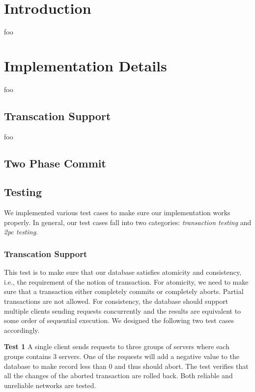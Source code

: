 \documentclass{vldb}
\begin{document}
\section{Introduction}

foo


\section{Implementation Details}

foo

\subsection{Transcation Support}

foo

\subsection{Two Phase Commit}

\subsection{Testing}

We implemented various test cases to make sure our implementation 
works properly. In general, our test cases fall into two categories: 
\textit{transaction testing} and \textit{2pc testing}. 

\subsubsection{Transcation Support}

This test is to make sure that our database satisfies atomicity and 
consistency, i.e., the requirement of the notion of transaction. For 
atomicity, we need to make sure that a transaction either completely 
commits or completely aborts. Partial transactions are not allowed.  
For consistency, the database should support multiple clients sending 
requests concurrently and the results are equivalent to some order of 
sequential execution. We designed the following two test cases 
accordingly.

\textbf{Test 1} A single client sends requests to three groups of 
servers where each groups contains 3 servers. One of the requests
will add a negative value to the database to make record less than 0 
and thus should abort. The test verifies that all the changes of the 
aborted transaction are rolled back. Both reliable and unreliable 
networks are tested.
\end{document}
